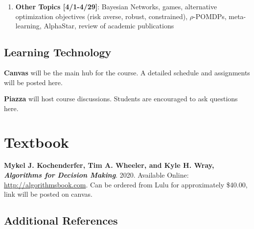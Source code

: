 \documentclass[9pt]{article}
\begin{document}
\begin{enumerate}[noitemsep]
\begin{multicols}{2}
\begin{itemize}[noitemsep]
            \item Bayesian filters
            \item Particle filters
            \item Partially observable Markov decision processes (POMDPs)
            \item Exact POMDP methods
            \item Offline POMDP methods
            \item Online POMDP methods
            \item QMDP
        \end{itemize}
        \end{multicols}
    \item \textbf{Other Topics [4/1-4/29]}: Bayesian Networks, games, alternative optimization objectives (risk averse, robust, constrained), $\rho$-POMDPs, meta-learning, AlphaStar, review of academic publications
\end{enumerate}

\begin{samepage}
\section*{Learning Technology}

\textbf{Canvas} will be the main hub for the course. A detailed schedule and assignments will be posted here.

\textbf{Piazza} will host course discussions. Students are encouraged to ask questions here.
\end{samepage}

\section*{Textbook}

\textbf{Mykel J. Kochenderfer, Tim A. Wheeler, and Kyle H. Wray, \textit{Algorithms for Decision Making}}. 2020. Available Online: \url{http://algorithmsbook.com}. Can be ordered from Lulu for approximately \$40.00, link will be posted on canvas.

\subsection*{Additional References}
\end{document}
